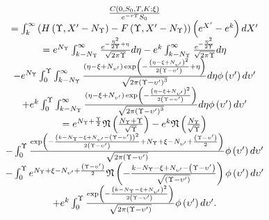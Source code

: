 \documentclass{article}
\begin{document}
\begin{equation}
\begin{array}{c}
\frac{C\left( 0,S_{0},T,K;\xi \right) }{e^{-rT}S_{0}} \\ 
=\int_{k}^{\infty }\left( H\left( \Upsilon ,X^{\prime }-N_{\Upsilon }\right)
-F\left( \Upsilon ,X^{\prime }-N_{\Upsilon }\right) \right) \left(
e^{X^{\prime }}-e^{k}\right) dX^{\prime } \\ 
=e^{N_{\Upsilon }}\int_{k-N_{\Upsilon }}^{\infty }\frac{e^{-\frac{\eta ^{2}}{%
2\Upsilon }+\eta }}{\sqrt{2\pi \Upsilon }}d\eta -e^{k}\int_{k-N_{\Upsilon
}}^{\infty }\frac{e^{-\frac{\eta ^{2}}{2\Upsilon }}}{\sqrt{2\pi \Upsilon }}%
d\eta \\ 
-e^{N_{\Upsilon }}\int_{0}^{\Upsilon }\int_{k-N_{\Upsilon }}^{\infty }\frac{%
\left( \eta -\xi +N_{\upsilon ^{\prime }}\right) \exp \left( -\frac{\left(
\eta -\xi +N_{\upsilon ^{\prime }}\right) ^{2}}{2\left( \Upsilon -\upsilon
^{\prime }\right) }+\eta \right) }{\sqrt{2\pi \left( \Upsilon -\upsilon
^{\prime }\right) ^{3}}}d\eta \phi \left( \upsilon ^{\prime }\right)
d\upsilon ^{\prime } \\ 
+e^{k}\int_{0}^{\Upsilon }\int_{k-N_{\Upsilon }}^{\infty }\frac{\left( \eta
-\xi +N_{\upsilon ^{\prime }}\right) \exp \left( -\frac{\left( \eta -\xi
+N_{\upsilon ^{\prime }}\right) ^{2}}{2\left( \Upsilon -\upsilon ^{\prime
}\right) }\right) }{\sqrt{2\pi \left( \Upsilon -\upsilon ^{\prime }\right)
^{3}}}d\eta \phi \left( \upsilon ^{\prime }\right) d\upsilon ^{\prime } \\ 
=e^{N_{\Upsilon }+\frac{\Upsilon }{2}}\mathfrak{N}\left( \frac{N_{\Upsilon
}+\Upsilon }{\sqrt{\Upsilon }}\right) -e^{k}\mathfrak{N}\left( \frac{%
N_{\Upsilon }}{\sqrt{\Upsilon }}\right) \\ 
-\int_{0}^{\Upsilon }\frac{\exp \left( -\frac{\left( k-N_{\Upsilon }-\xi
+N_{\upsilon ^{\prime }}-\left( \Upsilon -\upsilon ^{\prime }\right) \right)
^{2}}{2\left( \Upsilon -\upsilon ^{\prime }\right) }+N_{\Upsilon }+\xi
-N_{\upsilon ^{\prime }}+\frac{\left( \Upsilon -\upsilon ^{\prime }\right) }{%
2}\right) }{\sqrt{2\pi \left( \Upsilon -\upsilon ^{\prime }\right) }}\phi
\left( \upsilon ^{\prime }\right) d\upsilon ^{\prime } \\ 
-\int_{0}^{\Upsilon }e^{N_{\Upsilon }+\xi -N_{\upsilon ^{\prime }}+\frac{%
\left( \Upsilon -\upsilon ^{\prime }\right) }{2}}\mathfrak{N}\left( -\frac{%
k-N_{\Upsilon }-\xi +N_{\upsilon ^{\prime }}-\left( \Upsilon -\upsilon
^{\prime }\right) }{\sqrt{\left( \Upsilon -\upsilon ^{\prime }\right) }}%
\right) \phi \left( \upsilon ^{\prime }\right) d\upsilon ^{\prime } \\ 
+e^{k}\int_{0}^{\Upsilon }\frac{\exp \left( -\frac{\left( k-N_{\Upsilon
}-\xi +N_{\upsilon ^{\prime }}\right) ^{2}}{2\left( \Upsilon -\upsilon
^{\prime }\right) }\right) }{\sqrt{2\pi \left( \Upsilon -\upsilon ^{\prime
}\right) }}\phi \left( \upsilon ^{\prime }\right) d\upsilon ^{\prime }.%
\end{array}
\label{Eq78}
\end{equation}
\end{document}
